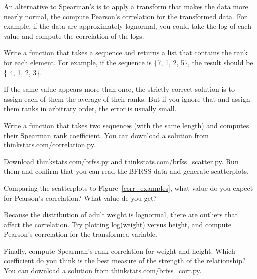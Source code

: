 \documentclass[12pt]{book}
\begin{document}
An alternative to Spearman's is to apply a transform that makes the
data more nearly normal, the compute Pearson's correlation for the
transformed data.  For example, if the data are approximately
lognormal, you could take the log of each value and compute the
correlation of the logs.

\begin{exercise}
Write a function that takes a sequence and returns a list that
contains the rank for each element.  For example, if the sequence is
\{7, 1, 2, 5\}, the result should be \{ 4, 1, 2, 3\}.

If the same value appears more than once, the strictly correct
solution is to assign each of them the average of their ranks.  But if
you ignore that and assign them ranks in arbitrary order, the error is
usually small.

Write a function that takes two sequences (with the same length) and
computes their Spearman rank coefficient.  You can download a solution
from \url{thinkstats.com/correlation.py}.

\end{exercise}


\begin{exercise}
Download \url{thinkstats.com/brfss.py} and
\url{thinkstats.com/brfss_scatter.py}.  Run them and confirm that you
can read the BFRSS data and generate scatterplots.

Comparing the scatterplots to Figure~\ref{corr_examples}, what value
do you expect for Pearson's correlation?  What value do you get?

Because the distribution of adult weight is lognormal, there are
outliers that affect the correlation.  Try plotting
log(weight) versus height, and compute Pearson's
correlation for the transformed variable.

Finally, compute Spearman's rank correlation for weight and height.
Which coefficient do you think is the best measure of the strength of
the relationship?  You can download a solution from
\url{thinkstats.com/brfss_corr.py}.

\end{exercise}
\end{document}
